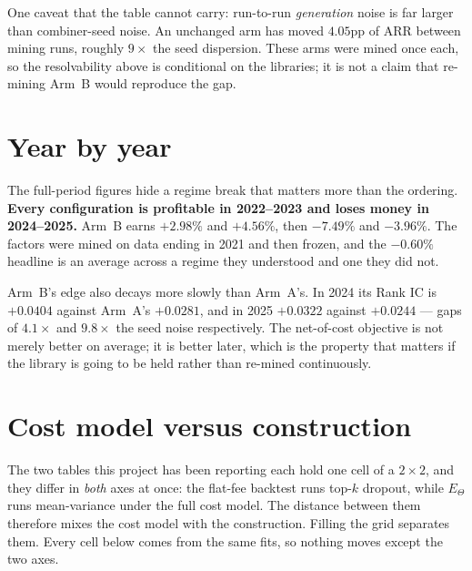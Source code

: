 \documentclass[11pt,a4paper]{article}
\newcommand{\Etheta}{E_{\Theta}}
\begin{document}
One caveat that the table cannot carry: run-to-run \emph{generation} noise is
far larger than combiner-seed noise. An unchanged arm has moved $4.05$pp of ARR
between mining runs, roughly $9\times$ the seed dispersion. These arms were
mined once each, so the resolvability above is conditional on the libraries;
it is not a claim that re-mining Arm~B would reproduce the gap.

\section{Year by year}

\begin{table}[h]\centering
\caption{Rank IC by calendar year.}
\end{table}

\begin{table}[h]\centering
\caption{Net ARR by calendar year, after full costs.}
\end{table}

\begin{table}[h]\centering
\caption{Net IR by calendar year.}
\end{table}

The full-period figures hide a regime break that matters more than the ordering.
\textbf{Every configuration is profitable in 2022--2023 and loses money in
2024--2025.} Arm~B earns $+2.98\%$ and $+4.56\%$, then $-7.49\%$ and $-3.96\%$.
The factors were mined on data ending in 2021 and then frozen, and the
$-0.60\%$ headline is an average across a regime they understood and one they
did not.

Arm~B's edge also decays more slowly than Arm~A's. In 2024 its Rank IC is
$+0.0404$ against Arm~A's $+0.0281$, and in 2025 $+0.0322$ against $+0.0244$ ---
gaps of $4.1\times$ and $9.8\times$ the seed noise respectively. The
net-of-cost objective is not merely better on average; it is better later, which
is the property that matters if the library is going to be held rather than
re-mined continuously.

\section{Cost model versus construction}
\label{sec:matrix}

The two tables this project has been reporting each hold one cell of a
$2\times2$, and they differ in \emph{both} axes at once: the flat-fee backtest
runs top-$k$ dropout, while $\Etheta$ runs mean-variance under the full cost
model. The distance between them therefore mixes the cost model with the
construction. Filling the grid separates them. Every cell below comes from the
same fits, so nothing moves except the two axes.
\end{document}
